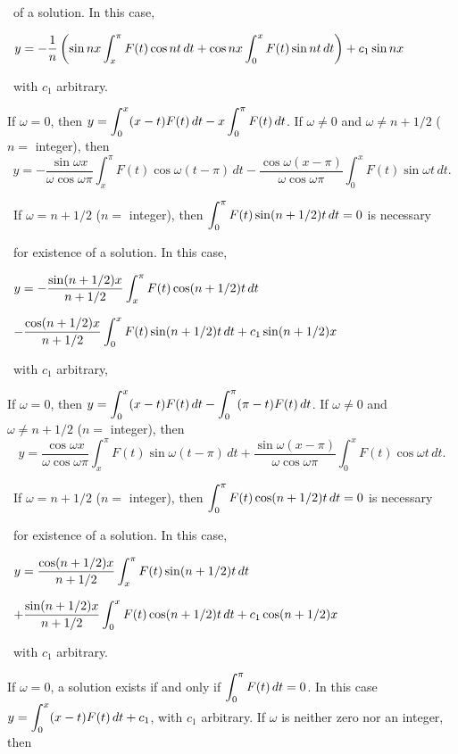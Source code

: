 \quad\;   \,
of a solution. In this case,

\smallskip

\quad\;   \,
$y=-\displaystyle{\frac{1}{n}\left(\sin nx\int_{x}^{\pi}F(t)\cos nt\,dt
+\cos nx\int_{0}^{x}F(t)\sin nt\,dt\right)+c_{1}\sin nx}$

\smallskip \quad\;   \,
 with $c_{1}$ arbitrary.

\smallskip
{} If $\omega=0$, then $y=\displaystyle{\int_{0}^{x}(x-t)F(t)\,dt-x\int_{0}^{\pi}F(t)\,dt}$. If $\omega\ne0$ and $\omega\ne n+1/2$   ($n=$ integer), then
$$
y=-\frac{\sin\omega x}{\omega\cos\omega
\pi}\int_{x}^{\pi}F(t)\cos\omega(t-\pi)\,dt
-\frac{\cos\omega(x-\pi)}{\omega\cos\omega\pi}\int_{0}^{x}F(t)\sin\omega
t\,dt.
$$

\smallskip \quad\;   \,
If $\omega=n+1/2$ ($n=$ integer), then
$\displaystyle{\int_{0}^{\pi}F(t)\sin(n+1/2)t\,dt=0}$
is necessary

 \quad\;   \,
 for existence of a solution. In this case,

\smallskip \quad\;   \,
$y=-\displaystyle{\frac{\sin(n+1/2)x}{n+1/2}\int_{x}^{\pi}F(t)\cos(n+1/2)t\,dt}$

\smallskip \quad\;   \,   \qquad \qquad
$-\displaystyle{\frac{\cos(n+1/2)x}{n+1/2}\int_{0}^{x}F(t)\sin(n+1/2)t\,dt
+c_{1}\sin(n+1/2)x}$

\quad\;   \,
with $c_{1}$ arbitrary,

\smallskip

 If $\omega=0$, then $y=\displaystyle{\int_{0}^{x}(x-t)F(t)\,dt-\int_{0}^{\pi}(\pi-t)F(t)\,dt}$. If $\omega\ne0$ and $\omega\ne n+1/2$   ($n=$ integer), then
$$
y=\frac{\cos\omega x}{\omega\cos\omega
\pi}\int_{x}^{\pi}F(t)\sin\omega(t-\pi)\,dt
+\frac{\sin\omega(x-\pi)}{\omega\cos\omega\pi}\int_{0}^{x}F(t)\cos\omega
t\,dt.
$$

\smallskip \quad\;   \,
If $\omega=n+1/2$ ($n=$ integer), then
$\displaystyle{\int_{0}^{\pi}F(t)\cos(n+1/2)t\,dt=0}$
is necessary

 \quad\;   \,
 for existence of a solution. In this case,

\smallskip \quad\;   \,
$y=\displaystyle{\frac{\cos(n+1/2)x}{n+1/2}\int_{x}^{\pi}F(t)\sin(n+1/2)t\,dt}$

\smallskip \quad\;   \,   \qquad \qquad
$+\displaystyle{\frac{\sin(n+1/2)x}{n+1/2}\int_{0}^{x}F(t)\cos(n+1/2)t\,dt
+c_{1}\cos(n+1/2)x}$

\quad\;   \,
with $c_{1}$ arbitrary.

\smallskip

 If $\omega=0$, a solution exists if and only if $\displaystyle{\int_{0}^{\pi}F(t)\,dt=0}$. In this case $y=\displaystyle{\int_{0}^{x}(x-t)F(t)\,dt+c_{1}}$, with $c_{1}$ arbitrary. If $\omega$ is neither zero nor an integer, then

